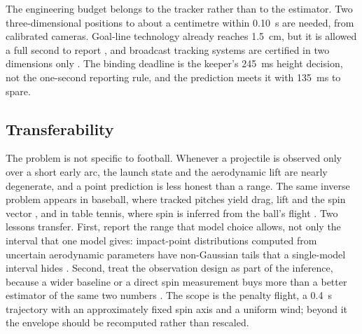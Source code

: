 The engineering budget belongs to the tracker rather than to the estimator.
Two three-dimensional positions to about a centimetre within \SI{0.10}{s} are
needed, from calibrated cameras. Goal-line technology already reaches
\SI{1.5}{cm}, but it is allowed a full second to report \citep{fifa2020glt},
and broadcast tracking systems are certified in two dimensions only
\citep{fifa2025epts}. The binding deadline is the keeper's \SI{245}{ms} height decision, not the
one-second reporting rule, and the prediction meets it with \SI{135}{ms} to
spare.

\subsection{Transferability}
\label{sec:disc-transfer}

The problem is not specific to football. Whenever a
projectile is observed only over a short early arc, the launch state and the
aerodynamic lift are nearly degenerate, and a point prediction is less honest
than a range. The same inverse problem appears in baseball, where tracked
pitches yield drag, lift and the spin vector \citep{nathan2008pitchfx}, and in
table tennis, where spin is inferred from the ball's flight
\citep{achterhold2023}. Two lessons transfer. First, report the range that
model choice allows, not only the interval that one model gives:
impact-point distributions computed from uncertain aerodynamic parameters have
non-Gaussian tails that a single-model interval hides
\citep{mehta2015,williamson2017}. Second, treat the observation design as part
of the inference, because a wider baseline or a direct spin measurement buys
more than a better estimator of the same two numbers \citep{shorter2013}. The
scope is the penalty flight, a \SI{0.4}{s} trajectory with an approximately
fixed spin axis and a uniform wind; beyond it the envelope should be
recomputed rather than rescaled.
